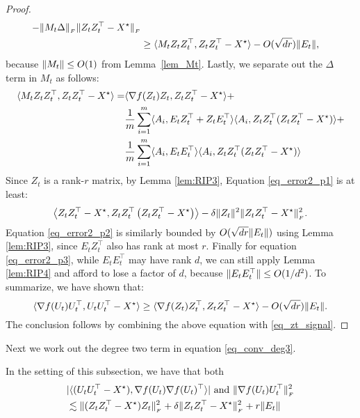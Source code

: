 \begin{proof}
\begin{align*}
			- \|M_t \Delta\|_{_{F}} {\|Z_tZ_t^{\top} - {X}^\star\|_{_{F}}} \\
		&\ge \langle M_t Z_tZ_t^{\top}, Z_tZ_t^{\top} - {X}^\star\rangle - O(\sqrt{dr}) \|E_t\|,
		\end{align*}
		because $\|M_t\| \le O(1)$ from Lemma~\ref{lem_Mt}. Lastly, we separate out the $\Delta$ term in $M_t$ as follows:
		\begin{align}
			\langle M_t Z_tZ_t^{\top}, Z_tZ_t^{\top} - {X}^\star\rangle
			= & \langle\nabla f(Z_t)Z_t, Z_tZ_t^{\top} - {X}^\star\rangle + \label{eq_error2_p1}\\
			& \frac 1 m \sum_{i=1}^m \langle A_i, E_tZ_t^{\top} + Z_tE_t^{\top}\rangle \langle A_i, Z_tZ_t^{\top} (Z_tZ_t^{\top} - {X}^\star)\rangle + \label{eq_error2_p2} \\
			& \frac 1 m \sum_{i=1}^m \langle A_i, E_tE_t^{\top}\rangle \langle A_i, Z_tZ_t^{\top} (Z_tZ_t^{\top} - {X}^\star)\rangle \label{eq_error2_p3}
		\end{align}
		Since $Z_t$ is a rank-$r$ matrix, by Lemma \ref{lem:RIP3}, Equation \eqref{eq_error2_p1} is at least:
		\begin{align}
			\left\langle Z_t Z_t^{\top} - {X}^\star , Z_t Z_t^{\top} \left(Z_t Z_t^{\top} - {X}^\star \right)\right\rangle - \delta \|Z_t\|^2 \|Z_t Z_t^{\top }- {X}^\star\|_{_{F}}^2. \label{eq_zt_signal}
		\end{align}
		Equation \eqref{eq_error2_p2} is similarly bounded by $O(\sqrt{dr} \|E_t\|)$ using Lemma \ref{lem:RIP3}, since $E_tZ_t^{\top}$ also has rank at most $r$.
		Finally for equation \eqref{eq_error2_p3}, while $E_tE_t^{\top}$ may have rank $d$, we can still apply Lemma \ref{lem:RIP4} and afford to lose a factor of $d$, because $\|E_tE_t^{\top}\| \le O(1 / d^2)$.
		To summarize, we have shown that:
		\[ \langle\nabla f(U_t) U_t^{\top}, U_tU_t^{\top} - {X}^\star\rangle
	\ge \langle\nabla f(Z_t) Z_t^{\top}, Z_tZ_t^{\top} - {X}^\star\rangle - O(\sqrt{dr}) \|E_t\|. \]
	The conclusion follows by combining the above equation with \eqref{eq_zt_signal}.
	\end{proof}
	Next we work out the degree two term in equation \eqref{eq_conv_deg3}.	
	\begin{claim}\label{claim_conv_deg2}
		In the setting of this subsection, we have that both
		\begin{align*}
		 & |\langle(U_tU_t^{\top} - {X}^\star), \nabla f(U_t)\nabla f(U_t)^{\top}\rangle|
		 \mbox{ and }
		 \|\nabla f(U_t) U_t^{\top}\|_{_{F}}^2 \\
		 & \lesssim \|(Z_tZ_t^{\top} - {X}^\star) Z_t\|_{_{F}}^2 + \delta \|Z_tZ_t^{\top} - {X}^\star\|_{_{F}}^2 + r \|E_t\|
		\end{align*}
	\end{claim}
